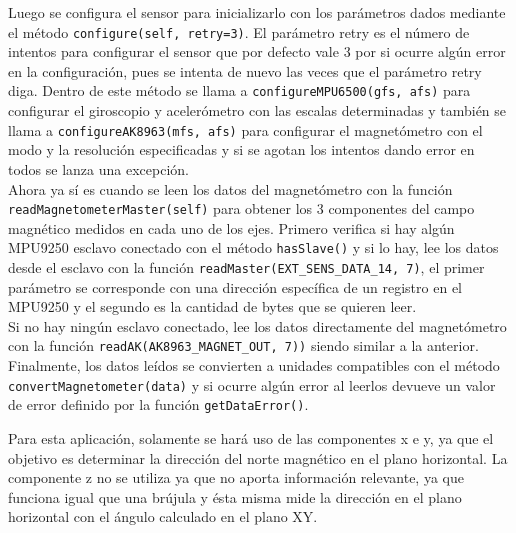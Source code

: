 Luego se configura el sensor para inicializarlo con los parámetros dados mediante el método \verb|configure(self, retry=3)|. El parámetro retry es el número de intentos para configurar el sensor que por defecto vale 3 por si ocurre algún error en la configuración, pues se intenta de nuevo las veces que el parámetro retry diga. Dentro de este método se llama a \verb|configureMPU6500(gfs, afs)| para configurar el giroscopio y acelerómetro con las escalas determinadas y también se llama a \verb|configureAK8963(mfs, afs)| para configurar el magnetómetro con el modo y la resolución especificadas y si se agotan los intentos dando error en todos se lanza una excepción.\\

Ahora ya sí es cuando se leen los datos del magnetómetro con la función \verb|readMagnetometerMaster(self)| para obtener los 3 componentes del campo magnético medidos en cada uno de los ejes. Primero verifica si hay algún MPU9250 esclavo conectado con el método \verb|hasSlave()| y si lo hay, lee los datos desde el esclavo con la función \verb|readMaster(EXT_SENS_DATA_14, 7)|, el primer parámetro se corresponde con una dirección específica de un registro en el MPU9250 y el segundo es la cantidad de bytes que se quieren leer. \\ Si no hay ningún esclavo conectado, lee los datos directamente del magnetómetro con la función \verb|readAK(AK8963_MAGNET_OUT, 7))| siendo similar a la anterior. Finalmente, los datos leídos se convierten a unidades compatibles con el método \verb|convertMagnetometer(data)| y si ocurre algún error al leerlos devueve un valor de error definido por la función \verb|getDataError()|.

Para esta aplicación, solamente se hará uso de las componentes x e y, ya que el objetivo es determinar la dirección del norte magnético en el plano horizontal. La componente z no se utiliza ya que no aporta información relevante, ya que funciona igual que una brújula y ésta misma mide la dirección en el plano horizontal con el ángulo calculado en el plano XY.\\





